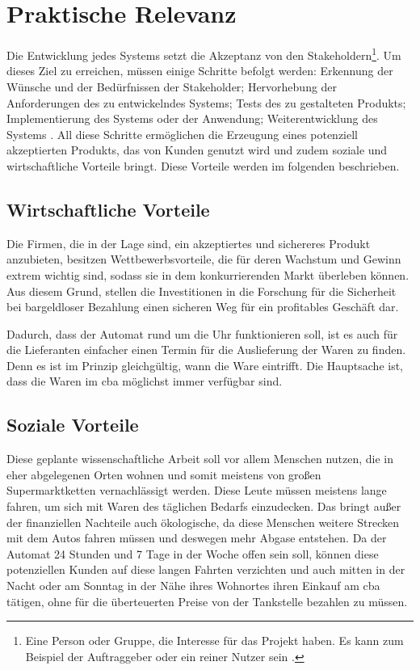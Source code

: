 \section{Praktische Relevanz}

Die Entwicklung jedes Systems setzt die Akzeptanz von den Stakeholdern\footnote{Eine Person oder Gruppe, die Interesse 
für das Projekt haben. Es kann zum Beispiel der Auftraggeber oder ein reiner Nutzer sein \cite{refip:HSSI}.}. Um dieses Ziel 
zu erreichen, müssen einige Schritte befolgt werden: Erkennung der Wünsche und der Bedürfnissen der Stakeholder; Hervorhebung 
der Anforderungen des zu entwickelndes Systems; Tests des zu gestalteten Produkts; Implementierung des Systems oder 
der Anwendung; Weiterentwicklung des Systems \cite{refbook:RECR}. All diese Schritte ermöglichen die Erzeugung eines 
potenziell akzeptierten Produkts, das von Kunden genutzt wird und zudem soziale und wirtschaftliche Vorteile bringt.
Diese Vorteile werden im folgenden beschrieben.


\subsection{Wirtschaftliche Vorteile}

Die Firmen, die in der Lage sind, ein akzeptiertes und sichereres Produkt anzubieten, besitzen Wettbewerbsvorteile, 
die für deren Wachstum und Gewinn extrem wichtig sind, sodass sie in dem konkurrierenden Markt überleben können. Aus 
diesem Grund, stellen die Investitionen in die Forschung für die Sicherheit bei bargeldloser Bezahlung einen sicheren 
Weg für ein profitables Geschäft dar.


Dadurch, dass der Automat rund um die Uhr funktionieren soll, ist es auch für die Lieferanten einfacher einen Termin 
für die Auslieferung der Waren zu finden. Denn es ist im Prinzip gleichgültig, wann die Ware eintrifft. Die Hauptsache 
ist, dass die Waren im \acrshort{cba} möglichst immer verfügbar sind. 


\subsection{Soziale Vorteile}

Diese geplante wissenschaftliche Arbeit soll vor allem Menschen nutzen, die in eher abgelegenen Orten wohnen und somit 
meistens von großen Supermarktketten vernachlässigt werden. Diese Leute müssen meistens lange fahren, um sich mit
Waren des täglichen Bedarfs einzudecken. Das bringt außer der finanziellen Nachteile auch ökologische, da diese Menschen 
weitere Strecken mit dem Autos fahren müssen und deswegen mehr Abgase entstehen. Da der Automat 24 Stunden und 7 Tage 
in der Woche offen sein soll, können diese potenziellen Kunden auf diese langen Fahrten verzichten und auch mitten in 
der Nacht oder am Sonntag in der Nähe ihres Wohnortes ihren Einkauf am \acrshort{cba} tätigen, ohne für die überteuerten
Preise von der Tankstelle bezahlen zu müssen. 

